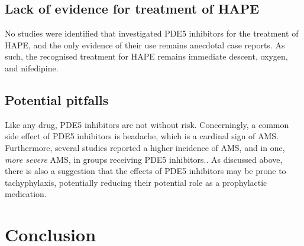 \documentclass[10pt,a4paper]{article}
\begin{document}
\subsection*{Lack of evidence for treatment of HAPE}

No studies were identified that investigated PDE5 inhibitors for the treatment of HAPE, and the only evidence of their use remains anecdotal case reports. As such, the recognised treatment for HAPE remains immediate descent, oxygen, and nifedipine.

\subsection*{Potential pitfalls}

Like any drug, PDE5 inhibitors are not without risk. Concerningly, a common side effect of PDE5 inhibitors is headache, which is a cardinal sign of AMS. Furthermore, several studies reported a higher incidence of AMS, and in one, \emph{more severe} AMS, in groups receiving PDE5 inhibitors.\cite{Maggiorini:2006kz,Bates:2011du,Leshem:2012jq}. As discussed above, there is also a suggestion that the effects of PDE5 inhibitors may be prone to tachyphylaxis, potentially reducing their potential role as a prophylactic medication.\cite{Bates:2011du}

\section*{Conclusion}





\end{document}
